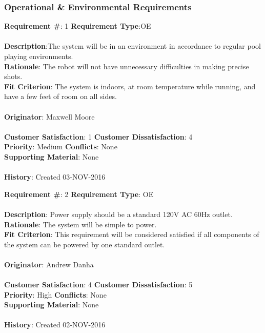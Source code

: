 \documentclass[titlepage]{article}
\begin{document}
\subsubsection{Operational \& Environmental Requirements}
\begin{framed}
	\noindent\textbf{Requirement \#}: 1 \hfill \textbf{Requirement Type}:OE \hfill\\\\
	\noindent\textbf{Description}:The system will be in an environment in accordance to regular pool playing environments.\\
	\textbf{Rationale}: The robot will not have unnecessary difficulties in making precise shots.\\
	\textbf{Fit Criterion}: The system is indoors, at room temperature while running, and have a few feet of room on all sides.\\\\
	\textbf{Originator}: Maxwell Moore\\\\
	\noindent\textbf{Customer Satisfaction}: 1 \hfill 	\textbf{Customer Dissatisfaction}: 4 \hfill\\
	\textbf{Priority}: Medium \hfill \textbf{Conflicts}: None \hfill\\
	\textbf{Supporting Material}: None\\\\
	\noindent\textbf{History}: Created 03-NOV-2016
\end{framed}

\begin{framed}
	\noindent\textbf{Requirement \#}: 2 \hfill \textbf{Requirement Type}: OE \hfill\\\\
	\noindent\textbf{Description}: Power supply should be a standard 120V AC 60Hz outlet.\\
	\textbf{Rationale}: The system will be simple to power.\\
	\textbf{Fit Criterion}: This requirement will be considered satisfied if all components of the system can be powered by one standard outlet.\\\\
	\textbf{Originator}: Andrew Danha\\\\
	\noindent\textbf{Customer Satisfaction}: 4 \hfill 	\textbf{Customer Dissatisfaction}: 5 \hfill\\
	\textbf{Priority}: High \hfill \textbf{Conflicts}: None \hfill\\
	\textbf{Supporting Material}: None\\\\
	\noindent\textbf{History}: Created 02-NOV-2016
\end{framed}
\end{document}

